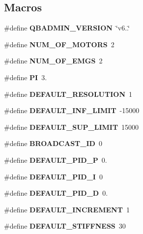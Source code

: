 \subsection*{Macros}
\begin{DoxyCompactItemize}
\item 
\mbox{\label{definitions_8h_a82178bde559e31158313c53e55709f7b}} 
\#define {\bfseries Q\+B\+A\+D\+M\+I\+N\+\_\+\+V\+E\+R\+S\+I\+ON}~\char`\"{}v6..\char`\"{}
\item 
\mbox{\label{definitions_8h_a39ac50737c1ee7d5b723b2597fdf6f26}} 
\#define {\bfseries N\+U\+M\+\_\+\+O\+F\+\_\+\+M\+O\+T\+O\+RS}~2
\item 
\mbox{\label{definitions_8h_a8e55cba7b8d4f9aa1eb36f311ce121e5}} 
\#define {\bfseries N\+U\+M\+\_\+\+O\+F\+\_\+\+E\+M\+GS}~2
\item 
\mbox{\label{definitions_8h_a598a3330b3c21701223ee0ca14316eca}} 
\#define {\bfseries PI}~3.
\item 
\mbox{\label{definitions_8h_a2674041fcb6b33ea03b7441c5bf07da1}} 
\#define {\bfseries D\+E\+F\+A\+U\+L\+T\+\_\+\+R\+E\+S\+O\+L\+U\+T\+I\+ON}~1
\item 
\mbox{\label{definitions_8h_a9df8ee92f567229e4e969a89792f7909}} 
\#define {\bfseries D\+E\+F\+A\+U\+L\+T\+\_\+\+I\+N\+F\+\_\+\+L\+I\+M\+IT}~-\/15000
\item 
\mbox{\label{definitions_8h_a664de08cc70be246edd326c4832574bb}} 
\#define {\bfseries D\+E\+F\+A\+U\+L\+T\+\_\+\+S\+U\+P\+\_\+\+L\+I\+M\+IT}~15000
\item 
\mbox{\label{definitions_8h_ab9fe47395310b34fa1ceb112c9ca10e2}} 
\#define {\bfseries B\+R\+O\+A\+D\+C\+A\+S\+T\+\_\+\+ID}~0
\item 
\mbox{\label{definitions_8h_a4c6daad09923a0ab3ed52ebb1c0b8cb8}} 
\#define {\bfseries D\+E\+F\+A\+U\+L\+T\+\_\+\+P\+I\+D\+\_\+P}~0.
\item 
\mbox{\label{definitions_8h_a6f7a63a5d40ee41381abe79b78993567}} 
\#define {\bfseries D\+E\+F\+A\+U\+L\+T\+\_\+\+P\+I\+D\+\_\+I}~0
\item 
\mbox{\label{definitions_8h_ab285c4cd42477c9669f9981d03572d2f}} 
\#define {\bfseries D\+E\+F\+A\+U\+L\+T\+\_\+\+P\+I\+D\+\_\+D}~0.
\item 
\mbox{\label{definitions_8h_a4956377066b3b3074de9c79d7e1d8967}} 
\#define {\bfseries D\+E\+F\+A\+U\+L\+T\+\_\+\+I\+N\+C\+R\+E\+M\+E\+NT}~1
\item 
\mbox{\label{definitions_8h_a8c5790f774337ec087041124dda03ed4}} 
\#define {\bfseries D\+E\+F\+A\+U\+L\+T\+\_\+\+S\+T\+I\+F\+F\+N\+E\+SS}~30

\end{DoxyCompactItemize}
